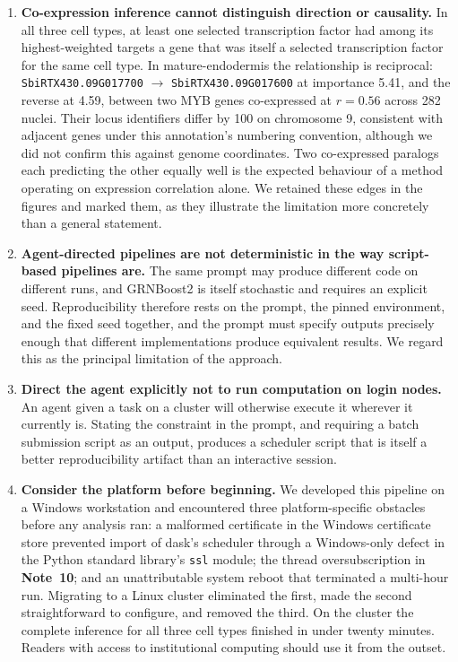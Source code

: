 \documentclass[11pt,a4paper]{article}
\begin{document}
\begin{enumerate}[leftmargin=*]
\item \textbf{Co-expression inference cannot distinguish direction or causality.} In all three cell types, at least one selected transcription factor had among its highest-weighted targets a gene that was itself a selected transcription factor for the same cell type. In mature-endodermis the relationship is reciprocal: \texttt{SbiRTX430.09G017700} $\rightarrow$ \texttt{SbiRTX430.09G017600} at importance 5.41, and the reverse at 4.59, between two MYB genes co-expressed at $r = 0.56$ across 282 nuclei. Their locus identifiers differ by 100 on chromosome 9, consistent with adjacent genes under this annotation's numbering convention, although we did not confirm this against genome coordinates. Two co-expressed paralogs each predicting the other equally well is the expected behaviour of a method operating on expression correlation alone. We retained these edges in the figures and marked them, as they illustrate the limitation more concretely than a general statement.

\item \textbf{Agent-directed pipelines are not deterministic in the way script-based pipelines are.} The same prompt may produce different code on different runs, and GRNBoost2 is itself stochastic and requires an explicit seed. Reproducibility therefore rests on the prompt, the pinned environment, and the fixed seed together, and the prompt must specify outputs precisely enough that different implementations produce equivalent results. We regard this as the principal limitation of the approach.

\item \textbf{Direct the agent explicitly not to run computation on login nodes.} An agent given a task on a cluster will otherwise execute it wherever it currently is. Stating the constraint in the prompt, and requiring a batch submission script as an output, produces a scheduler script that is itself a better reproducibility artifact than an interactive session.

\item \textbf{Consider the platform before beginning.} We developed this pipeline on a Windows workstation and encountered three platform-specific obstacles before any analysis ran: a malformed certificate in the Windows certificate store prevented import of dask's scheduler through a Windows-only defect in the Python standard library's \texttt{ssl} module; the thread oversubscription in \textbf{Note~10}; and an unattributable system reboot that terminated a multi-hour run. Migrating to a Linux cluster eliminated the first, made the second straightforward to configure, and removed the third. On the cluster the complete inference for all three cell types finished in under twenty minutes. Readers with access to institutional computing should use it from the outset.


\end{enumerate}
\end{document}
